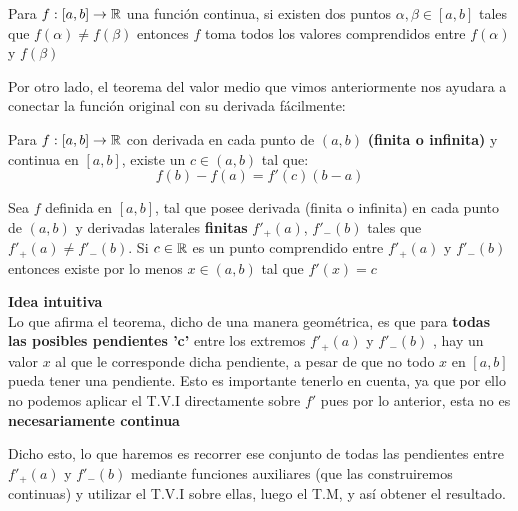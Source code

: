 \begin{itemize}
	\begin{teorema}
	    Para \(f: [a,b] \to \mathbb{R}\) una función continua, si existen dos puntos \(\alpha, \beta \in [a,b]\) tales que \(f(\alpha) \neq f(\beta)\) entonces \(f\) toma todos los valores comprendidos entre \(f(\alpha)\) y \(f(\beta)\)
	\end{teorema}
	
	Por otro lado, el teorema del valor medio que vimos anteriormente nos ayudara a conectar la función original con su derivada fácilmente:
	
	\begin{teorema}
	Para  \(f: [a,b] \to \mathbb{R}\) con derivada en cada punto de \((a,b)\)  \textbf{(finita o infinita) }y continua en \([a,b]\), existe un \(c \in (a,b)\) tal que: \[f(b) - f(a) = f'(c)(b-a)\]
	\end{teorema}
\end{itemize}


\begin{teorema}
Sea \(f\) definida en \([a,b]\), tal que posee derivada (finita o infinita) en cada punto de \((a,b)\) y derivadas laterales \textbf{finitas} \(f'_{+}(a)\), \(f'_{-}(b)\) tales que \(f'_{+}(a) \neq f'_{-}(b)\). Si \(c \in \mathbb{R}\) es un punto comprendido entre \(f'_{+}(a)\) y \(f'_{-}(b)\) entonces existe por lo menos \(x \in (a,b)\) tal que \(f'(x) = c\)
\end{teorema}

\noindent  \textbf{Idea intuitiva}  \\

\normalsize Lo que afirma el teorema, dicho de una manera geométrica, es que para\textbf{ todas las posibles pendientes 'c'} entre los extremos \(f'_{+}(a)\) y \(f'_{-}(b)\) , hay un valor \(x\) al que le corresponde dicha pendiente, a pesar de que no todo \(x\) en \([a,b]\) pueda tener una pendiente. Esto es importante tenerlo en cuenta, ya que por ello no podemos aplicar el T.V.I directamente sobre \(f'\) pues por lo anterior, esta no es \textbf{necesariamente continua}

Dicho esto, lo que haremos es recorrer ese conjunto de todas las pendientes entre \(f'_{+}(a)\) y \(f'_{-}(b)\) mediante funciones auxiliares (que las construiremos continuas) y utilizar el T.V.I sobre ellas, luego el T.M, y así obtener el resultado.

